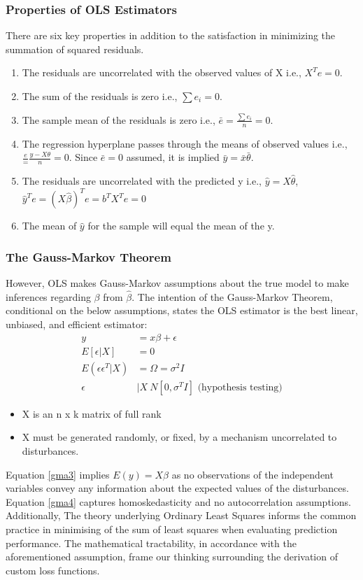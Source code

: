 \documentclass[10pt]{article}
\begin{document}
\subsubsection{Properties of OLS Estimators}
There are six key properties in addition to the satisfaction in minimizing the summation of squared residuals.
\begin{enumerate}
	\item The residuals are uncorrelated with the observed values of X i.e., $X^{T}e=0$.
	\item The sum of the residuals is zero i.e., $\sum e_i=0$.
	\item The sample mean of the residuals is zero i.e., $\bar{e} = \frac{\sum e_i}{n} = 0$.
	\item The regression hyperplane passes through the means of observed values i.e., $\frac{e} = \frac{y - X\theta}{n} = 0$. Since $\bar{e} = 0$ assumed, it is implied $\bar{y}=\bar{x}\bar{\theta}$.
	\item The residuals are uncorrelated with the predicted y i.e., $\hat{y} = X\hat{\theta}$, $\hat{y}^{T}e = (X\hat{\beta})^{T}e = b^{T}X^{T}e = 0$ 
	\item The mean of $\hat{y}$ for the sample will equal the mean of the y.
\end{enumerate}
\subsubsection{The Gauss-Markov Theorem}
However, OLS makes Gauss-Markov assumptions about the true model to make inferences regarding $\beta$ from $\hat{\beta}$.
The intention of the Gauss-Markov Theorem, conditional on the below assumptions, states the OLS estimator is the best linear, unbiased, and efficient estimator: 
\begin{align}
	y &= x\beta + \epsilon\\
	E[\epsilon|X] &= 0 \label{gma3}\\
	E(\epsilon \epsilon^{T}|X) &= \Omega = \sigma^{2}I \label{gma4}\\
	\epsilon &| X ~ N[0,\sigma^{T}I] \text{ (hypothesis testing)}
\end{align}
\begin{itemize}
	\item X is an n x k matrix of full rank
	\item X must be generated randomly, or fixed, by a mechanism uncorrelated to disturbances.
\end{itemize}
Equation \ref{gma3} implies $E(y) = X\beta$ as no observations of the independent variables convey any information about the expected values of the disturbances.
Equation \ref{gma4} captures homoskedasticity and no autocorrelation assumptions.
Additionally,
The theory underlying Ordinary Least Squares informs the common practice in minimising of the sum of least squares when evaluating prediction performance.
The mathematical tractability, in accordance with the aforementioned assumption, frame our thinking surrounding the derivation of custom loss functions.
\end{document}
